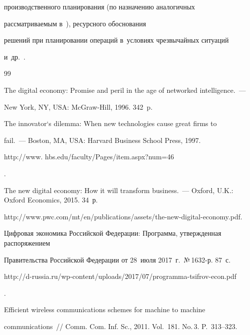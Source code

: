 производственного планирования (по назначению аналогичных 


рас\-смат\-ри\-ва\-емым в~\cite{25-il, 26-il, 27-il, 28-il}), ресурсного обоснования 


решений при планировании операций в~условиях чрезвычайных ситуаций 


и~др.~\cite{24-il}.





{\small\frenchspacing


{%




\begin{thebibliography}{99}




 The digital economy: Promise and peril in the age of networked intelligence.~--- 


New York, NY, USA: McGraw-Hill, 1996. 342~p.




 The innovator`s dilemma: When new technologies cause great firms to 


fail.~--- Boston, MA, USA: Harvard Business School Press, 1997. {\sf 


http://www. hbs.edu/faculty/Pages/item.aspx?num=46}.




 The new digital economy: How it will transform business.~--- Oxford, U.K.: Oxford Economics, 2015. 34~р.


 {\sf http://www.pwc.com/mt/en/publications/assets/the-new-digital-economy.pdf}.




Цифровая экономика Российской Федерации: Программа, утвержденная распоряжением 


Правительства Российской Федерации от 28~июля 2017~г.\ №\,1632-р. 87~с. {\sf  


http://d-russia.ru/wp-content/uploads/2017/07/programma-tsifrov-econ.pdf}.







 Efficient wireless communications schemes for machine to machine 


communications~/\!\!/ Comm. Com. Inf. Sc., 2011. Vol.~181. No.\,3. P.~313--323.






\end{thebibliography}}}
